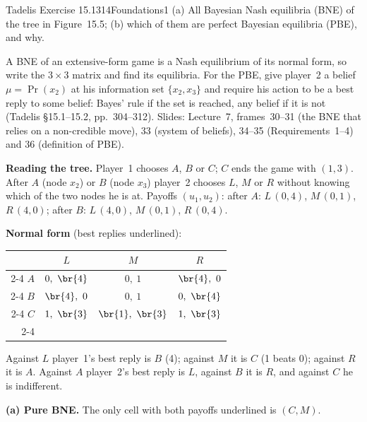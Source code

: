 \begin{exsol}{Tadelis Exercise 15.1}{314}{Foundations}{1}
\asked (a) All Bayesian Nash equilibria (BNE) of the tree in Figure~15.5; (b) which of them are
perfect Bayesian equilibria (PBE), and why.

\method A BNE of an extensive-form game is a Nash equilibrium of its normal form, so write the
$3\times3$ matrix and find its equilibria. For the PBE, give player~2 a belief $\mu = \Pr(x_2)$ at his
information set $\{x_2, x_3\}$ and require his action to be a best reply to some belief: Bayes' rule
if the set is reached, any belief if it is not (Tadelis \S15.1--15.2, pp.~304--312). Slides:
Lecture~7, frames~30--31 (the BNE that relies on a non-credible move), 33 (system of beliefs),
34--35 (Requirements~1--4) and 36 (definition of PBE).

\solution
\textbf{Reading the tree.} Player~1 chooses $A$, $B$ or $C$; $C$ ends the game with $(1, 3)$. After $A$
(node $x_2$) or $B$ (node $x_3$) player~2 chooses $L$, $M$ or $R$ without knowing which of the two nodes
he is at. Payoffs $(u_1, u_2)$: after $A$: $L\,(0,4)$, $M\,(0,1)$, $R\,(4,0)$; after $B$: $L\,(4,0)$,
$M\,(0,1)$, $R\,(0,4)$.

\textbf{Normal form} (best replies underlined):
\begin{center}
\begin{tabular}{r|c|c|c|}
\multicolumn{1}{r}{} & \multicolumn{1}{c}{$L$} & \multicolumn{1}{c}{$M$} & \multicolumn{1}{c}{$R$}\\ \cline{2-4}
$A$ & $0,\ \br{4}$ & $0,\ 1$ & $\br{4},\ 0$ \\ \cline{2-4}
$B$ & $\br{4},\ 0$ & $0,\ 1$ & $0,\ \br{4}$ \\ \cline{2-4}
$C$ & $1,\ \br{3}$ & $\br{1},\ \br{3}$ & $1,\ \br{3}$ \\ \cline{2-4}
\end{tabular}
\end{center}
Against $L$ player~1's best reply is $B$ (4); against $M$ it is $C$ (1 beats 0); against $R$ it is $A$.
Against $A$ player~2's best reply is $L$, against $B$ it is $R$, and against $C$ he is indifferent.

\textbf{(a) Pure BNE.} The only cell with both payoffs underlined is $(C, M)$.


\end{exsol}
